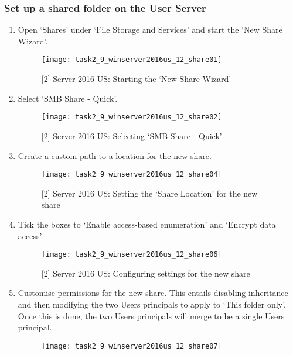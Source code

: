 \subsubsection{Set up a shared folder on the User Server}
\begin{enumerate}[series=task2methodology5]
  \item Open `Shares' under `File Storage and Services' and start the `New Share Wizard'.
    \begin{figure}[H]
      \centering
      \captionsetup{skip=2pt}
      \texttt{[image: task2\_9\_winserver2016us\_12\_share01]}
      \caption{[2] Server 2016 US: Starting the `New Share Wizard'}
      \label{fig:task2:vspherec_ussf01}
    \end{figure}
  \item Select `SMB Share - Quick'.
    \begin{figure}[H]
      \centering
      \captionsetup{skip=2pt}
      \texttt{[image: task2\_9\_winserver2016us\_12\_share02]}
      \caption{[2] Server 2016 US: Selecting `SMB Share - Quick'}
      \label{fig:task2:vspherec_ussf02}
    \end{figure}
  \item Create a custom path to a location for the new share.
    \begin{figure}[H]
      \centering
      \captionsetup{skip=2pt}
      \texttt{[image: task2\_9\_winserver2016us\_12\_share04]}
      \caption{[2] Server 2016 US: Setting the `Share Location' for the new share}
      \label{fig:task2:vspherec_ussf04}
    \end{figure}
  \item Tick the boxes to `Enable access-based enumeration' and `Encrypt data access'.
    \begin{figure}[H]
      \centering
      \captionsetup{skip=2pt}
      \texttt{[image: task2\_9\_winserver2016us\_12\_share06]}
      \caption{[2] Server 2016 US: Configuring settings for the new share}
      \label{fig:task2:vspherec_ussf06}
    \end{figure}
  \item Customise permissions for the new share. This entails disabling inheritance and then modifying the two Users principals to apply to `This folder only'. Once this is done, the two Users principals will merge to be a single Users principal.
    \begin{figure}[H]
      \centering
      \captionsetup{skip=2pt}
      \texttt{[image: task2\_9\_winserver2016us\_12\_share07]}

\end{figure}
\end{enumerate}
